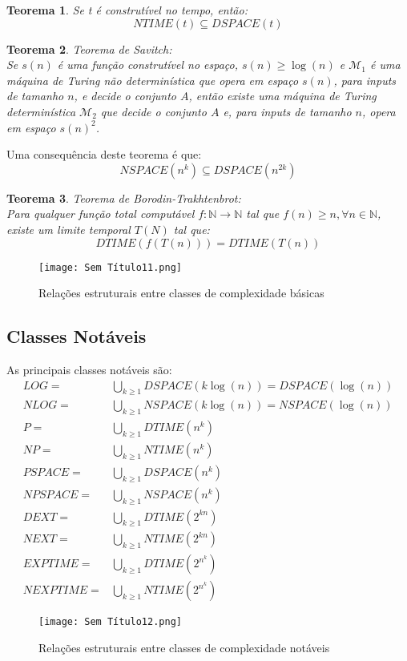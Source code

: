 \documentclass[10pt,a4paper]{report}
\newtheorem{theorem}{Teorema}
\begin{document}
\begin{theorem}
Se t é construtível no tempo, então:
$$
NTIME(t) \subseteq DSPACE(t)
$$
\end{theorem}
\begin{theorem} Teorema de Savitch:\\
Se $s(n)$ é uma função construtível no espaço, $s(n) \geq \log (n)$ e $\mathcal{M}_1$ é uma máquina de Turing não determinística que opera em espaço $s(n)$, para inputs de tamanho $n$, e decide o conjunto $A$, então existe uma máquina de Turing determinística $\mathcal{M}_2$ que decide o conjunto $A$ e, para inputs de tamanho $n$, opera em espaço $s(n)^2$.
\end{theorem}
Uma consequência deste teorema é que:
$$
NSPACE(n^k) \subseteq DSPACE(n^{2k})
$$
\begin{theorem}Teorema de Borodin-Trakhtenbrot:\\
Para qualquer função total computável $f: \mathbb{N} \rightarrow \mathbb{N}$ tal que $f(n) \geq n, \forall n \in \mathbb{N}$, existe um limite temporal $T(N)$ tal que:
$$
DTIME(f(T(n))) = DTIME(T(n))
$$
\end{theorem}
\begin{figure}[H]
\centering
\texttt{[image: Sem Título11.png]}
\caption{Relações estruturais entre classes de complexidade básicas}
\end{figure}
\subsection{Classes Notáveis}
As principais classes notáveis são:
\begin{align}
LOG = &\bigcup_{k \geq 1} DSPACE(k \log(n)) = DSPACE(\log(n))\\
NLOG = &\bigcup_{k \geq 1} NSPACE(k \log(n)) = NSPACE(\log(n))\\
P = &\bigcup_{k \geq 1} DTIME(n^k)\\
NP = &\bigcup_{k \geq 1} NTIME(n^k)\\
PSPACE = &\bigcup_{k \geq 1} DSPACE(n^k)\\
NPSPACE = &\bigcup_{k \geq 1} NSPACE(n^k)\\
DEXT = &\bigcup_{k \geq 1} DTIME(2^{kn})\\
NEXT = &\bigcup_{k \geq 1} NTIME(2^{kn})\\
EXPTIME = &\bigcup_{k \geq 1} DTIME(2^{n^k})\\
NEXPTIME = &\bigcup_{k \geq 1} NTIME(2^{n^k})
\end{align}
\begin{figure}[H]
\centering
\texttt{[image: Sem Título12.png]}
\caption{Relações estruturais entre classes de complexidade notáveis}
\end{figure}
\end{document}
